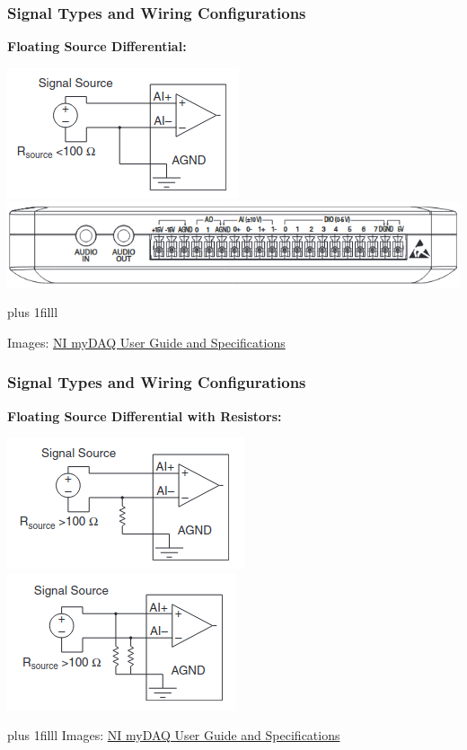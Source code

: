 \documentclass[fleqn]{beamer} %
\newcommand{\sectionIIsubsectionItitle}{Signal Types and Wiring Configurations}
\newcommand{\btVFill}{\vskip0pt plus 1filll}
\begin{document}
		    \begin{frame}[label=sectionIIsubsectionI]
				\frametitle{\sectionIIsubsectionItitle} \scriptsize
        
        \textbf{Floating Source Differential:}\vspcc

        \includegraphics[scale=.4]{images/floating_source_differential_cropped.png}        
        \includegraphics[scale=.3]{images/myDAQ_IOconnector.png}        
        
        \btVFill

        \tiny{Images: \href{https://www.ni.com/docs/en-US/bundle/mydaq-features/resource/373060g.pdf?srsltid=AfmBOopyngxK8Pza757m5IPrgx3KmoUmOST4Bx7spVeotMbMLTHwKHL1}{NI myDAQ User Guide and Specifications}}
  			\end{frame}	
		    \begin{frame}[label=sectionIIsubsectionI]
				\frametitle{\sectionIIsubsectionItitle} \scriptsize
        
        \textbf{Floating Source Differential with Resistors:}\vspcc

        \includegraphics[scale=.4]{images/floating_source_differential_single_resistor_cropped.png}  \vspcc      
        \includegraphics[scale=.4]{images/floating_source_differential_two_resistors_cropped.png}        
        
        \btVFill
        \tiny{Images: \href{https://www.ni.com/docs/en-US/bundle/mydaq-features/resource/373060g.pdf?srsltid=AfmBOopyngxK8Pza757m5IPrgx3KmoUmOST4Bx7spVeotMbMLTHwKHL1}{NI myDAQ User Guide and Specifications}}
  			\end{frame}	
\end{document}
